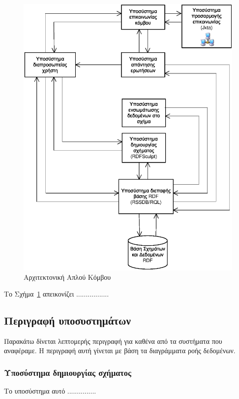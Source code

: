 \begin{figure}[!ht] \centering
\includegraphics{static/figures/peerArchitecture.eps} \caption{Αρχιτεκτονική Απλού
Κόμβου}\label{figure4.1}
\end{figure}

Το Σχήμα~\ref{figure4.1} απεικονίζει .................


\subsection{Περιγραφή υποσυστημάτων}
Παρακάτω δίνεται λεπτομερής περιγραφή για καθένα από τα συστήματα
που αναφέραμε. Η περιγραφή αυτή γίνεται με βάση τα διαγράμματα
ροής δεδομένων.

\subsubsection{Υποσύστημα δημιουργίας σχήματος}
Το υποσύστημα αυτό ...............